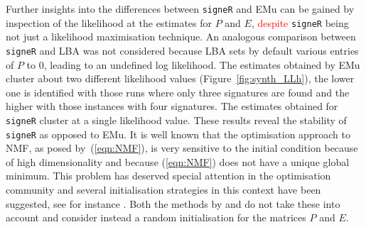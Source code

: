 \documentclass{bioinfo}
\begin{document}
Further insights into the differences between \texttt{signeR} and EMu
can be gained by inspection of the likelihood at the estimates for $P$
and $E$, \textcolor{red}{despite} \texttt{signeR} being not just a
likelihood maximisation technique. An analogous comparison between
\texttt{signeR} and LBA was not considered because LBA sets by default
various entries of $P$ to 0, leading to an undefined log
likelihood. The estimates obtained by EMu cluster about two different
likelihood values (Figure~\ref{fig:synth_LLh}), the lower one is
identified with those runs where only three signatures are found and
the higher with those instances with four signatures. The estimates
obtained for \texttt{signeR} cluster at a single likelihood
value. These results reveal the stability of \texttt{signeR} as
opposed to EMu. It is well known that the optimisation approach to
NMF, as posed by~(\ref{eqn:NMF}), is very sensitive to the initial
condition because of high dimensionality and because (\ref{eqn:NMF})
does not have a unique global minimum. This problem has deserved
special attention in the optimisation community and several
initialisation strategies in this context have been suggested, see for
instance \cite{BBLPP, BG}. Both the methods by \cite{FICMV} and
\cite{A} do not take these into account and consider instead a random
initialisation for the matrices $P$ and $E$.
\end{document}

